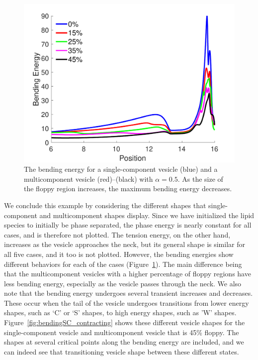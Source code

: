 \documentclass[twoside,twocolumn,9pt]{article}
\begin{document}
\begin{figure}[h]
  \centering
  \includegraphics[width=\columnwidth]{figures/bendingContracting.pdf}
  \caption{\label{fig:bendingAll} \small The bending energy for a
  single-component vesicle (blue) and a multicomponent vesicle
  (red)--(black) with $\alpha = 0.5$. As the size of the floppy region
  increases, the maximum bending energy decreases.}
\end{figure}

We conclude this example by considering the different shapes that
single-component and multicomponent shapes display. Since we have
initialized the lipid species to initially be phase separated, the phase
energy is nearly constant for all cases, and is therefore not plotted.
The tension energy, on the other hand, increases as the vesicle
approaches the neck, but its general shape is similar for all five
cases, and it too is not plotted. However, the bending energies show
different behaviors for each of the cases (Figure~\ref{fig:bendingAll}).
The main difference being that the multicomponent vesicles with a higher
percentage of floppy regions have less bending energy, especially as the
vesicle passes through the neck. We also note that the bending energy
undergoes several transient increases and decreases. These occur when
the tail of the vesicle undergoes transitions from lower energy shapes,
such as `C' or `S' shapes, to high energy shapes, such as 'W' shapes.
Figure~\ref{fig:bendingSC_contracting} shows these different vesicle
shapes for the single-component vesicle and multicomponent vesicle that
is 45\% floppy. The shapes at several critical points along the bending
energy are included, and we can indeed see that transitioning vesicle
shape between these different states.
\end{document}
